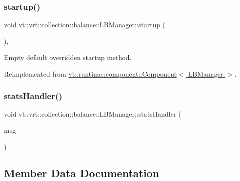 \subsubsection{\texorpdfstring{startup()}{startup()}}
{\footnotesize\ttfamily void vt\+::vrt\+::collection\+::balance\+::\+L\+B\+Manager\+::startup (\begin{DoxyParamCaption}{ }\end{DoxyParamCaption})\hspace{0.3cm}{\ttfamily [override]}, {\ttfamily [virtual]}}



Empty default overridden startup method. 



Reimplemented from \hyperlink{structvt_1_1runtime_1_1component_1_1_component_aad3974307ab3b2e1df389a91310f68c2}{vt\+::runtime\+::component\+::\+Component$<$ L\+B\+Manager $>$}.

\mbox{\label{structvt_1_1vrt_1_1collection_1_1balance_1_1_l_b_manager_ac068db6bbf9109fc15786b1298279f87}} 
\subsubsection{\texorpdfstring{stats\+Handler()}{statsHandler()}}
{\footnotesize\ttfamily void vt\+::vrt\+::collection\+::balance\+::\+L\+B\+Manager\+::stats\+Handler (\begin{DoxyParamCaption}\item[{\hyperlink{structvt_1_1vrt_1_1collection_1_1balance_1_1_l_b_manager_afedd89b1c2db43f087c1757db6200d36}{Stats\+Msg\+Type} $\ast$}]{msg }\end{DoxyParamCaption})}



\subsection{Member Data Documentation}
\mbox{\label{structvt_1_1vrt_1_1collection_1_1balance_1_1_l_b_manager_ace781095ef59c156a0b23dea6dea70db}} 
